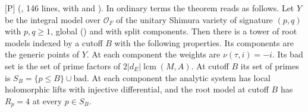\documentclass[11pt]{article}
\newcommand{\mP}{\textsf{[P]}}
\theoremstyle{remark}
\begin{document}
\mP{}  (, 146 lines, with  and ). In ordinary terms the theorem reads as follows. Let $Y$ be the integral model over $\mathcal O_F$ of the unitary Shimura variety of signature $(p,q)$ with $p,q\ge1$, global () and with split components. Then there is a tower of root models indexed by a cutoff $B$ with the following properties. Its components are the generic points of $Y$. At each component the weights are $\nu(\tau,i)=-i$. Its bad set is the set of prime factors of $2\lvert d_E\rvert\operatorname{lcm}(M,A)$. At cutoff $B$ its set of primes is $S_B=\{p\le B\}\cup\mathrm{bad}$. At each component the analytic system has local holomorphic lifts with injective differential, and the root model at cutoff $B$ has $R_p=4$ at every $p\in S_B$.
\end{document}
